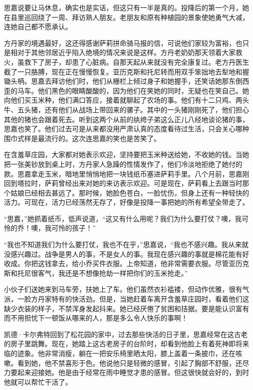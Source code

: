\par 思嘉说要让马休息，确实也是实话，但这只有一半是真的。投降后的第一个月，她在县里巡回绕了一周、拜访熟人朋友。老朋友和原有种植园的景象使她勇气大减，连她自己都不愿承认。
\par 方丹家的境遇最好，这还得感谢萨莉拼命骑马报的信，可说他们家较为富裕，也只是相对于其他邻居近乎陷入绝境的情况来说是这样。方丹老奶奶那天领着大家救火，虽救下了房子，却患了心脏病。自那天起从来就没有完全康复过。老方丹医生截了一只胳膊，现在正在慢慢恢复。亚历克斯和托尼转而用双手笨拙地去犁地和握锄头柄。思嘉去拜访他们时，他们从栅栏上倾过身子和她握手，还笑话她那东倒西歪的马车。他们黑色的眼睛酸酸的，因为他们在笑她的同时，无疑也在笑自己。她向他们买玉米种，他们满口答应，接着就聊起了农场的事。他们有十二只鸡、两头牛、五头猪，还有他们从战场上带回来的骡子。其中的一头猪刚刚死了，他们担心其他的猪也会跟着死去。听到这两个从前的纨绔子弟这么正儿八经地谈论猪的事，思嘉也笑了。他们过去可是从来都没用严肃认真的态度看待过生活，只会关心哪种围巾式样是最流行的。这次连思嘉的笑也是苦笑了。
\par 在含羞草庄园，大家都对她表示欢迎，坚持要把玉米种送给她，不收她的钱。当她把一张美钞放到桌上时，方丹家人急躁的性情发作了，他们冷淡地拒绝了她付的款。思嘉拿走玉米，暗地里悄悄地把一块钱纸币塞进萨莉手里。八个月前，思嘉刚回到塔拉时，萨莉曾经出来对她的来访表示欢迎。可是现在，萨莉看上去跟当时那个姑娘已经相去甚远了。那时候，她脸色苍白，一脸忧伤，但身上还有一种轻快的活力。可现在，活力已经荡然无存了，好像是投降一事把她的所有希望全带走了。
\par “思嘉，”她抓着纸币，低声说道，“这又有什么用呢？我们为什么要打仗？噢，我可怜的乔！噢，我可怜的孩子！”
\par “我也不知道我们为什么要打仗，我也不在乎，”思嘉说，“我也不感兴趣。我从来就没感兴趣过。战争是男人的事，不是女人的事。我现在感兴趣的事就是棉花能有好收成。你把这钱拿去，给小乔买件衣服。上帝知道，他非常需要衣服。尽管亚历克斯和托尼很客气，我还是不想像抢劫一样把你们的玉米抢走。”
\par 小伙子们送她来到马车旁，扶她上了车。他们虽然衣衫褴褛，但动作优雅，很有气派，一脸方丹家特有的快活劲。但是，当她赶着车离开含羞草庄园时，看着他们这缺少衣装的样子，不禁浑身发起抖来。她已经厌倦了贫困和拮据。要是能认识富有而不用担忧下一顿饭从哪来的人，那是多么令人快乐的事啊！
\par 凯德·卡尔弗特回到了松花园的家中，过去那些快活的日子里，思嘉经常在这古老的房子里跳舞。现在，她踏上这古老房子的台阶时，却看到他脸上有着死神即将来临的迹象。他非常消瘦，躺在一把安乐椅里晒太阳，膝上盖着一条披巾，还在咳嗽。看到她，他不禁喜形于色。他说他只是轻微的感冒，引起了胸部不舒服，还尽力要起来迎接她。他是由于经常在雨中睡觉才患的感冒。但这很快就会好的，到时他就可以帮忙干活了。
